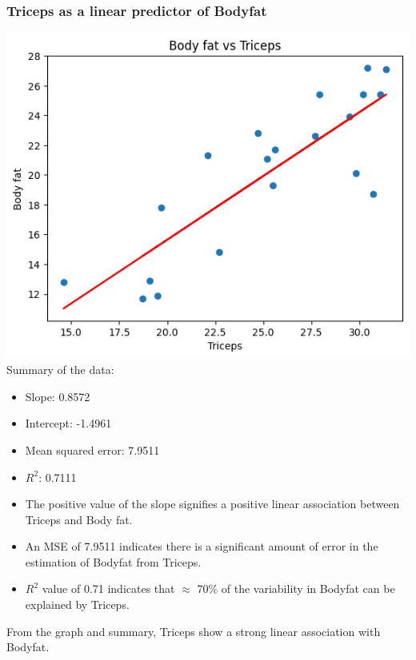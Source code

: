 \documentclass[12pt]{article}
\begin{document}
\subsubsection*{Triceps as a linear predictor of Bodyfat}
\includegraphics*[width=\linewidth]{graph4b1}
Summary of the data:
\begin{itemize}
    \item Slope: 0.8572
    \item Intercept: -1.4961
    \item Mean squared error: 7.9511
    \item \(R^2\): 0.7111
    \item The positive value of the slope signifies a positive linear association
    between Triceps and Body fat.
    \item An MSE of 7.9511 indicates there is a significant amount of error in
    the estimation of Bodyfat from Triceps.
    \item \(R^2\) value of 0.71 indicates that \(\approx\) 70\% of the variability
    in Bodyfat can be explained by Triceps.
\end{itemize}
From the graph and summary, Triceps show a strong linear association with Bodyfat.
\newpage
\end{document}
